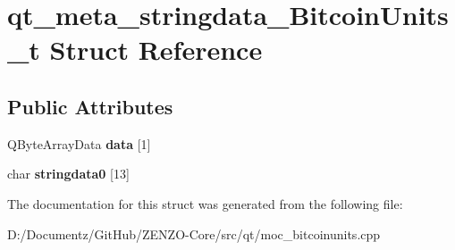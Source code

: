 \hypertarget{structqt__meta__stringdata___bitcoin_units__t}{}\section{qt\+\_\+meta\+\_\+stringdata\+\_\+\+Bitcoin\+Units\+\_\+t Struct Reference}
\label{structqt__meta__stringdata___bitcoin_units__t}
\subsection*{Public Attributes}
\begin{DoxyCompactItemize}
\item 
\mbox{\label{structqt__meta__stringdata___bitcoin_units__t_ac34996daf6f2f7422b4ba167f68891ed}} 
Q\+Byte\+Array\+Data {\bfseries data} \mbox{[}1\mbox{]}
\item 
\mbox{\label{structqt__meta__stringdata___bitcoin_units__t_ad6a33cfa1f3332a30310bf11e22d37bc}} 
char {\bfseries stringdata0} \mbox{[}13\mbox{]}
\end{DoxyCompactItemize}


The documentation for this struct was generated from the following file\+:\begin{DoxyCompactItemize}
\item 
D\+:/\+Documentz/\+Git\+Hub/\+Z\+E\+N\+Z\+O-\/\+Core/src/qt/moc\+\_\+bitcoinunits.\+cpp\end{DoxyCompactItemize}
